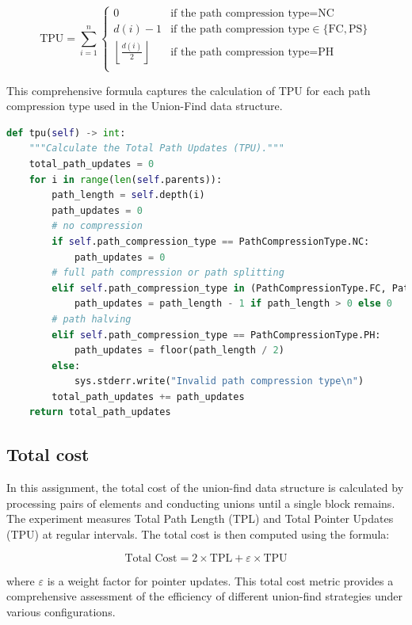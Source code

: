 \documentclass[10pt,a4paper,hidelinks]{article}
\begin{document}
\[
\text{TPU} = \sum_{i=1}^{n} 
\begin{cases} 
0 & \text{if the path compression type} = \text{NC} \\
d(i) - 1 & \text{if the path compression type} \in \{\text{FC}, \text{PS}\} \\
\left\lfloor \frac{d(i)}{2} \right\rfloor & \text{if the path compression type} = \text{PH} \\
\end{cases}
\]

This comprehensive formula captures the calculation of TPU for each path compression type used in the Union-Find data structure.

\begin{lstlisting}[language=Python, caption=Python implementation of TPU for each compression type]
def tpu(self) -> int:
    """Calculate the Total Path Updates (TPU)."""
    total_path_updates = 0
    for i in range(len(self.parents)):
        path_length = self.depth(i)
        path_updates = 0
        # no compression
        if self.path_compression_type == PathCompressionType.NC:
            path_updates = 0
        # full path compression or path splitting
        elif self.path_compression_type in (PathCompressionType.FC, PathCompressionType.PS):
            path_updates = path_length - 1 if path_length > 0 else 0
        # path halving
        elif self.path_compression_type == PathCompressionType.PH:
            path_updates = floor(path_length / 2)
        else:
            sys.stderr.write("Invalid path compression type\n")
        total_path_updates += path_updates
    return total_path_updates
\end{lstlisting}

\subsection{Total cost}
In this assignment, the total cost of the union-find data structure is calculated by processing pairs of elements and conducting unions until a single block remains. The experiment measures Total Path Length (TPL) and Total Pointer Updates (TPU) at regular intervals. The total cost is then computed using the formula:

$$\text{Total Cost} = 2 \times \text{TPL} + \varepsilon \times \text{TPU}$$

where $\varepsilon$ is a weight factor for pointer updates. This total cost metric provides a comprehensive assessment of the efficiency of different union-find strategies under various configurations.
\end{document}
